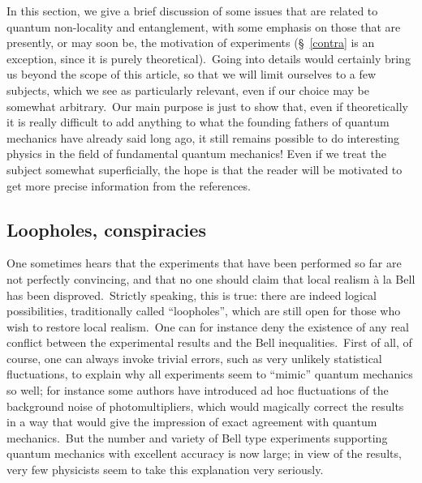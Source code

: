 \documentclass[12pt,onecolumn]{article}%
\begin{document}
In this section, we give a brief discussion of some issues that are related to
quantum non-locality and entanglement, with some emphasis on those that are
presently, or may soon be, the motivation of experiments (\S \ \ref{contra} is
an exception, since it is purely theoretical).\ Going into details would
certainly bring us beyond the scope of this article, so that we will limit
ourselves to a few subjects, which we see as particularly relevant, even if
our choice may be somewhat arbitrary.\ Our main purpose is just to show that,
even if theoretically it is really difficult to add anything to what the
founding fathers of quantum mechanics have already said long ago, it still
remains possible to do interesting physics in the field of fundamental quantum
mechanics! Even if we treat the subject somewhat superficially, the hope is
that the reader will be motivated to get more precise information from the references.

\subsection{Loopholes, conspiracies}

\label{loopholes}

One sometimes hears that the experiments that have been performed so far are
not perfectly convincing, and that no one should claim that local realism
\`{a} la Bell has been disproved.\ Strictly speaking, this is true: there are
indeed logical possibilities, traditionally called ``loopholes'', which are
still open for those who wish to restore local realism.\ One can for instance
deny the existence of any real conflict between the experimental results and
the Bell inequalities.\ First of all, of course, one can always invoke trivial
errors, such as very unlikely statistical fluctuations, to explain why all
experiments seem to ``mimic'' quantum mechanics so well; for instance some
authors have introduced ad hoc fluctuations of the background noise of
photomultipliers, which would magically correct the results in a way that
would give the impression of exact agreement with quantum mechanics.\ But the
number and variety of Bell type experiments supporting quantum mechanics with
excellent accuracy is now large; in view of the results, very few physicists
seem to take this explanation very seriously.
\end{document}
